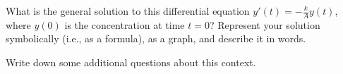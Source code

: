 \documentclass{ximera}
\begin{document}
\begin{question}
What is the general solution to this differential equation $y'(t)=-\frac{k}{A}y(t)$, where $y(0)$ is the concentration at time $t=0$? 
 Represent your solution symbolically (i.e., as a formula), as a graph, and describe it in words.   
\begin{freeResponse}
\end{freeResponse}
\end{question}

\begin{question}
Write down some additional questions about this context.       
\begin{freeResponse}
\end{freeResponse}
\end{question}
\end{document}
